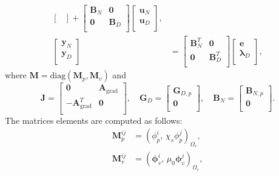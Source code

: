 \documentclass[aspectratio=169]{ISAE-Beamer}
\begin{document}
\begin{frame}
\begin{equation}
\begin{aligned}
\begin{bmatrix}
	\end{bmatrix} + \begin{bmatrix}
	\mathbf{B}_N & \mathbf{0}\\
	\mathbf{0} & \mathbf{B}_D \\
	\end{bmatrix}
	\begin{bmatrix}
	\mathbf{u}_N \\
	\mathbf{u}_D \\
	\end{bmatrix}, \\
	\begin{bmatrix}
	\mathbf{y}_N \\
	\mathbf{y}_D \\
	\end{bmatrix} &=
	\begin{bmatrix}
	\mathbf{B}_N^T & \mathbf{0} \\ 
	\mathbf{0} & \mathbf{B}_D^T \\ 
	\end{bmatrix}
	\begin{bmatrix}
	\mathbf{e}\\
	\bm{\lambda}_D \\
	\end{bmatrix},
	\end{aligned}
	\end{equation}
	where $\mathbf{M} = \mathrm{diag}(\mathbf{M}_p, \mathbf{M}_v)$ and
	\begin{equation*}
	\mathbf{J} = \begin{bmatrix}
	\mathbf{0} & \mathbf{A}_{\mathrm{grad}} \\
	- \mathbf{A}_{\mathrm{grad}}^T & \mathbf{0} \\
	\end{bmatrix}, \quad 
	\mathbf{G}_{D} = \begin{bmatrix}
	\mathbf{G}_{D, p} \\
	\mathbf{0} \\
	\end{bmatrix}, \quad
	\mathbf{B}_{N} = \begin{bmatrix}
	\mathbf{B}_{N, p} \\
	\mathbf{0} \\
	\end{bmatrix}.
	\end{equation*}
	The matrices elements are computed as follows:
	\begin{equation*}
	\begin{aligned}
	\mathbf{M}_p^{ij} &= ({\phi}_{p}^i,\, \chi_s {\phi}_{p}^j)_{\Omega_r}, \\ \mathbf{M}_v^{ij} &= (\bm{\phi}_{v}^i,\, \mu_0 \bm{\phi}_{v}^j)_{\Omega_r}, \\

\end{aligned}
\end{equation*}
\end{frame}
\end{document}
